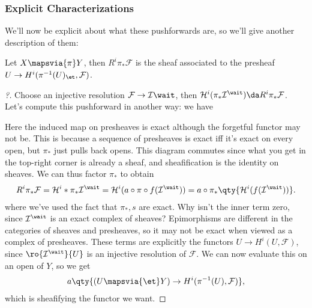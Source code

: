 \hypertarget{explicit-characterizations}{%
\subsubsection{Explicit
Characterizations}\label{explicit-characterizations}}

We'll now be explicit about what these pushforwards are, so we'll give
another description of them:

\begin{proposition}[?]

Let \(X \mapsvia{\pi} Y\), then \(R^i \pi_* \mathcal{F}\) is the sheaf
associated to the presheaf \(U\to H^i(\pi^{-1}(U)_\et, \mathcal{F})\).

\end{proposition}

\begin{proof}[?]

Choose an injective resolution \(\mathcal{F}\to \mathcal{I}\wait\), then
\(\mathcal{H}^i(\pi_* \mathcal{I}^\wait) \da R^i \pi_* \mathcal{F}\).
Let's compute this pushforward in another way: we have

\begin{center}
\end{center}

Here the induced map on presheaves is exact although the forgetful
functor may not be. This is because a sequence of presheaves is exact
iff it's exact on every open, but \(\pi_*\) just pulls back opens. This
diagram commutes since what you get in the top-right corner is already a
sheaf, and sheafification is the identity on sheaves. We can thus factor
\(\pi_*\) to obtain
\begin{align*}  
R^i \pi_* \mathcal{F} = \mathcal{H}^i*\pi_* \mathcal{I}^\wait
= \mathcal{H}^i(a\circ \pi \circ f (\mathcal{I}^\wait))
= a\circ \pi_*\qty{\mathcal{H}^i(f(\mathcal{I}^\wait)) }
.\end{align*} where we've used the fact that \(\pi_*, s\) are exact. Why
isn't the inner term zero, since \(\mathcal{I}^\wait\) is an exact
complex of sheaves? Epimorphisms are different in the categories of
sheaves and presheaves, so it may not be exact when viewed as a complex
of presheaves. These terms are explicitly the functors
\(U\to H^i(U, \mathcal{F})\), since \(\ro{\mathcal{I}^\wait}{U}\) is an
injective resolution of \(\mathcal{F}\). We can now evaluate this on an
open of \(Y\), so we get
\begin{align*}  
a \qty{ (U \mapsvia{\et} Y) \to H^i(\pi^{-1}(U), \mathcal{F}) }
,\end{align*} which is sheafifying the functor we want.


\end{proof}
